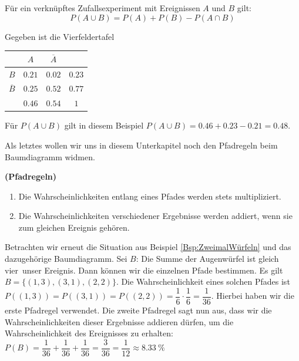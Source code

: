 \documentclass[ngerman, 12pt]{nssheetxea}
\begin{document}
\begin{theorem}
Für ein verknüpftes Zufallsexperiment mit Ereignissen $A$ und $B$ gilt:
\[ P(A\cup B) = P(A) + P(B) - P(A\cap B)\]
\label{Satz:VerknüpftesZufallsexperiment}
\end{theorem}

\begin{example}
Gegeben ist die Vierfeldertafel 
\begin{center}
\begin{tabular}{c | c | c | c}
 & $A$ & $\overline{A}$ & \\
 \hline
 $B$ & $\num{0,21}$ & $\num{0,02}$ & $\num{0,23}$ \\
 \hline
 $\overline{B}$ & $\num{0,25}$ & $\num{0,52}$ & $\num{0,77}$ \\
 \hline
 & $\num{0,46}$ & $\num{0,54}$ & $\num{1}$
\end{tabular}
\end{center}
Für $P(A\cup B)$ gilt in diesem Beispiel $P(A\cup B)=\num{0,46}+\num{0,23}-\num{0,21}=\num{0,48}$. 
\end{example}

Als letztes wollen wir uns in diesem Unterkapitel noch den Pfadregeln beim Baumdiagramm widmen.

\begin{theorem} \textbf{(Pfadregeln)} \
\begin{enumerate}
\item Die Wahrscheinlichkeiten entlang eines Pfades werden stets multipliziert.
\item Die Wahrscheinlichkeiten verschiedener Ergebnisse werden addiert, wenn sie zum gleichen Ereignis gehören.
\end{enumerate}
\end{theorem}

\begin{example}
Betrachten wir erneut die Situation aus Beispiel \ref{Bsp:ZweimalWürfeln} und das dazugehörige Baumdiagramm. Sei $B$: \glqq Die Summe der Augenwürfel ist gleich vier\grqq \ unser Ereignis. Dann können wir die einzelnen Pfade bestimmen. Es gilt $B=\{ (1,3), (3,1), (2,2)  \}$. Die Wahrscheinlichkeit eines solchen Pfades ist $P((1,3))=P((3,1))=P((2,2))=\dfrac{1}{6}\cdot \dfrac{1}{6} = \dfrac{1}{36}$. Hierbei haben wir die erste Pfadregel verwendet. Die zweite Pfadregel sagt nun aus, dass wir die Wahrscheinlichkeiten dieser Ergebnisse addieren dürfen, um die Wahrscheinlichkeit des Ereignisses zu erhalten: $P(B)=\dfrac{1}{36}+\dfrac{1}{36}+\dfrac{1}{36}=\dfrac{3}{36}=\dfrac{1}{12} \approx \SI{8,33}{\percent}$
\end{example}
\end{document}
